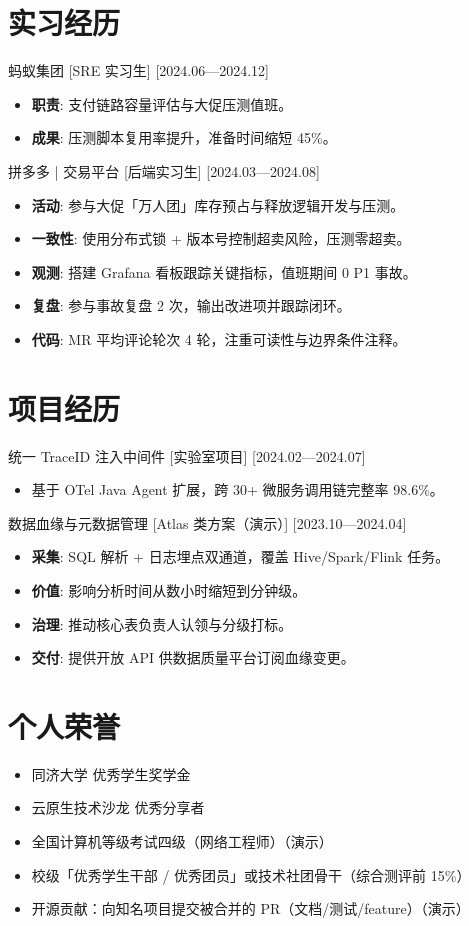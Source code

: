 \documentclass{resume-photo}
\begin{document}
\section{实习经历}
\ResumeItem
{蚂蚁集团}
[\textnormal{SRE 实习生}]
[2024.06—2024.12]

\begin{itemize}
  \item \textbf{职责}: 支付链路容量评估与大促压测值班。
  \item \textbf{成果}: 压测脚本复用率提升，准备时间缩短 45\%。
\end{itemize}


\ResumeItem
{拼多多 | 交易平台}
[\textnormal{后端实习生}]
[2024.03—2024.08]

\begin{itemize}
  \item \textbf{活动}: 参与大促「万人团」库存预占与释放逻辑开发与压测。
  \item \textbf{一致性}: 使用分布式锁 + 版本号控制超卖风险，压测零超卖。
  \item \textbf{观测}: 搭建 Grafana 看板跟踪关键指标，值班期间 0 P1 事故。
  \item \textbf{复盘}: 参与事故复盘 2 次，输出改进项并跟踪闭环。
  \item \textbf{代码}: MR 平均评论轮次 4 轮，注重可读性与边界条件注释。
\end{itemize}



\section{项目经历}
\ResumeItem
{统一 TraceID 注入中间件}
[\textnormal{实验室项目}]
[2024.02—2024.07]

\begin{itemize}
  \item 基于 OTel Java Agent 扩展，跨 30+ 微服务调用链完整率 98.6\%。
\end{itemize}


\ResumeItem
{数据血缘与元数据管理}
[\textnormal{Atlas 类方案（演示）}]
[2023.10—2024.04]

\begin{itemize}
  \item \textbf{采集}: SQL 解析 + 日志埋点双通道，覆盖 Hive/Spark/Flink 任务。
  \item \textbf{价值}: 影响分析时间从数小时缩短到分钟级。
  \item \textbf{治理}: 推动核心表负责人认领与分级打标。
  \item \textbf{交付}: 提供开放 API 供数据质量平台订阅血缘变更。
\end{itemize}



\section{个人荣誉}
\begin{itemize}
  \item 同济大学 优秀学生奖学金
  \item 云原生技术沙龙 优秀分享者
  \item 全国计算机等级考试四级（网络工程师）（演示）
  \item 校级「优秀学生干部 / 优秀团员」或技术社团骨干（综合测评前 15\%）
  \item 开源贡献：向知名项目提交被合并的 PR（文档/测试/feature）（演示）
\end{itemize}
\end{document}
